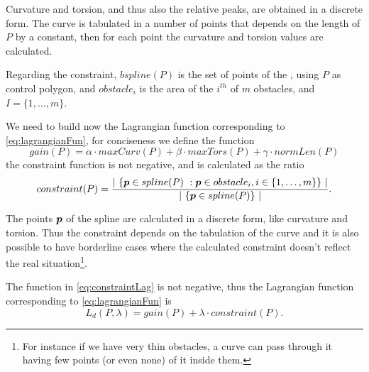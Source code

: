 \documentclass[dissertation.tex]{subfiles}
\begin{document}
Curvature and torsion, and thus also the
relative peaks, are obtained in a discrete form. The \bs curve is
tabulated in a number of points that depends on the length of $P$
by a constant, then for each point the curvature and torsion values
are calculated.

Regarding the constraint, $bspline(P)$
is the set of points of the \emph{\bs}, using $P$ as 
control polygon, and 
$obstacle_i$ is the area of the $i^{th}$ of $m$ obstacles, and
$I=\{1,\dots,m\}$.

We need to build now the Lagrangian function corresponding to
\cref{eq:lagrangianFun}, for conciseness we define the function
\begin{equation}\label{eq:gainLag}
  gain(P) = \alpha\cdot maxCurv(P)+\beta\cdot
    maxTors(P)+\gamma\cdot normLen(P)
\end{equation}
the constraint function is not negative, and is calculated as the
ratio
\begin{equation}\label{eq:constraintLag}
constraint(P) = \frac{\left|\ \{\boldsymbol{p} \in spline(P)\ : \boldsymbol{p}\in
    obstacle_i, i\in\{1,\dots,m\}\}\ \right|}{\left|\ \{\boldsymbol{p} \in
    spline(P)\}\ \right|}.
\end{equation}


The points $\boldsymbol{p}$ of the spline are calculated in a discrete
form, like curvature and torsion. Thus the constraint depends on the
tabulation of the curve and
it is also possible to have borderline cases where the calculated
constraint doesn't reflect the real situation\footnote{For instance if
  we have very thin obstacles, a curve can pass through it having few
  points (or even none) of it inside them.}.

The
function in \cref{eq:constraintLag} is not negative, thus the
Lagrangian function corresponding to 
\cref{eq:lagrangianFun} is
\begin{equation}\label{eq:lagrangianFunProj}
    L_d(P,\lambda)=gain(P)+\lambda\cdot constraint(P).
\end{equation}
\end{document}
